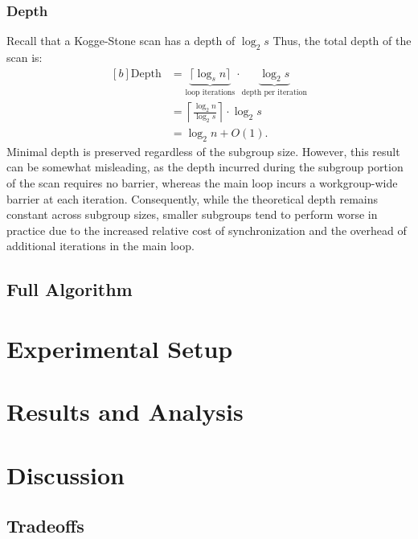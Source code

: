 \documentclass[sigconf]{acmart}
\begin{document}
 \subsubsection{Depth}
 Recall that a Kogge-Stone scan has a depth of $\log_2 s$ Thus, the total depth of the scan is:
 \begin{equation}
  \begin{aligned}[b]
      \text{Depth} &= \underbrace{\lceil \log_s n \rceil}_{\text{loop iterations}} 
      \cdot \underbrace{\log_2 s}_{\text{depth per iteration}} \\
      &= \left\lceil \frac{\log_2 n}{\log_2 s} \right\rceil \cdot \log_2 s \\
      &= \log_2 n + O(1).
  \end{aligned}
 \end{equation}
 Minimal depth is preserved regardless of the subgroup size. However, this result can be somewhat misleading, as the depth incurred during the subgroup portion of the scan requires no barrier, whereas the main loop incurs a workgroup-wide barrier at each iteration. Consequently, while the theoretical depth remains constant across subgroup sizes, smaller subgroups tend to perform worse in practice due to the increased relative cost of synchronization and the overhead of additional iterations in the main loop.
\subsection{Full Algorithm}

\section{Experimental Setup}

\section{Results and Analysis}

\section{Discussion}

\subsection{Tradeoffs}
\end{document}
